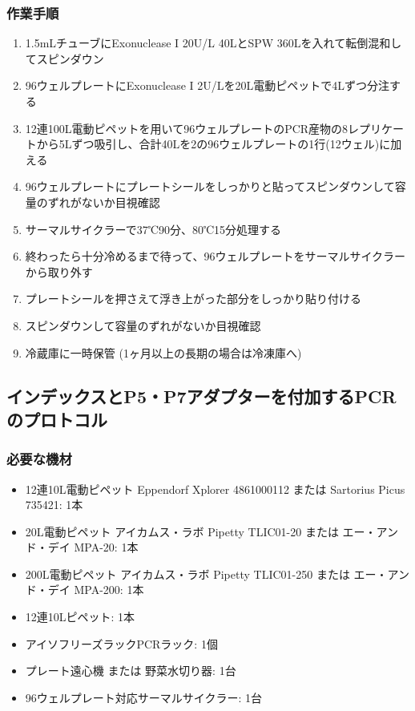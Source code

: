 \documentclass[titlepage,10pt,a4paper]{jsbook}
\begin{document}
\subsubsection{作業手順}
\begin{enumerate}
\item 1.5mLチューブにExonuclease I 20U/{\textmu}L 40{\textmu}LとSPW 360{\textmu}Lを入れて転倒混和してスピンダウン
\item 96ウェルプレートにExonuclease I 2U/{\textmu}Lを20{\textmu}L電動ピペットで4{\textmu}Lずつ分注する
\item 12連100{\textmu}L電動ピペットを用いて96ウェルプレートのPCR産物の8レプリケートから5{\textmu}Lずつ吸引し、合計40{\textmu}Lを2の96ウェルプレートの1行(12ウェル)に加える
\item 96ウェルプレートにプレートシールをしっかりと貼ってスピンダウンして容量のずれがないか目視確認
\item サーマルサイクラーで37℃90分、80℃15分処理する
\item 終わったら十分冷めるまで待って、96ウェルプレートをサーマルサイクラーから取り外す
\item プレートシールを押さえて浮き上がった部分をしっかり貼り付ける
\item スピンダウンして容量のずれがないか目視確認
\item 冷蔵庫に一時保管 (1ヶ月以上の長期の場合は冷凍庫へ)
\end{enumerate}

\subsection{インデックスとP5・P7アダプターを付加するPCRのプロトコル}

\subsubsection{必要な機材}
\begin{itemize}
\item 12連10{\textmu}L電動ピペット Eppendorf Xplorer 4861000112 または Sartorius Picus 735421: 1本
\item 20{\textmu}L電動ピペット アイカムス・ラボ Pipetty TLIC01-20 または エー・アンド・デイ MPA-20: 1本
\item 200{\textmu}L電動ピペット アイカムス・ラボ Pipetty TLIC01-250 または エー・アンド・デイ MPA-200: 1本
\item 12連10{\textmu}Lピペット: 1本
\item アイソフリーズラックPCRラック: 1個
\item プレート遠心機 または 野菜水切り器: 1台
\item 96ウェルプレート対応サーマルサイクラー: 1台
\end{itemize}
\end{document}
